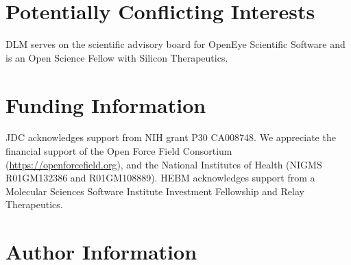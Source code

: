 \documentclass[9pt,bestpractices]{livecoms}
\begin{document}
\section{Potentially Conflicting Interests}

DLM serves on the scientific advisory board for OpenEye Scientific Software and is an Open Science Fellow with Silicon Therapeutics.

\section{Funding Information}
JDC acknowledges support from NIH grant P30 CA008748.
We appreciate the financial support of the Open Force Field Consortium (\url{https://openforcefield.org}), and the National Institutes of Health (NIGMS R01GM132386 and R01GM108889).
HEBM acknowledges support from a Molecular Sciences Software Institute Investment Fellowship and Relay Therapeutics. 


\section*{Author Information}
\makeorcid




\end{document}
